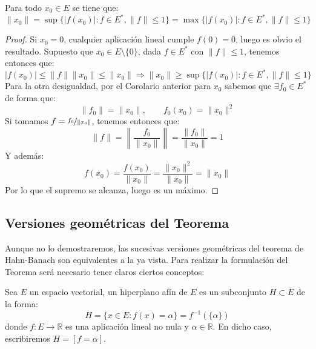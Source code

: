 \begin{coro}\label{coro:calcular_norma_x}
    Para todo $x_0\in E$ se tiene que:
    \begin{equation*}
        \|x_0\| = \sup\{|f(x_0)| : f\in E^\ast, \|f\| \leq 1\} = \max\{|f(x_0)| : f\in E^\ast, \|f\| \leq 1\}
    \end{equation*}
    \begin{proof}
        Si $x_0=0$, cualquier aplicación lineal cumple $f(0)=0$, luego es obvio el resultado. Supuesto que $x_0\in E\setminus\{0\}$, dada $f\in E^\ast$ con $\|f\| \leq 1$, tenemos entonces que:
        \begin{equation*}
            |f(x_0)| \leq \|f\|\|x_0\| \leq \|x_0\| \Longrightarrow \|x_0\| \geq \sup\{|f(x_0)| : f\in E^\ast, \|f\| \leq 1\} 
        \end{equation*}
        Para la otra desigualdad, por el Corolario anterior para $x_0$ sabemos que $\exists f_0\in E^\ast$ de forma que:
        \begin{equation*}
            \|f_0\| = \|x_0\|, \qquad f_0(x_0) = \|x_0\|^2
        \end{equation*}
        Si tomamos $f = \nicefrac{f_0}{\|x_0\|}$, tenemos entonces que:
        \begin{equation*}
            \|f\| = \left\|\dfrac{f_0}{\|x_0\|}\right\| = \dfrac{\|f_0\|}{\|x_0\|} = 1
        \end{equation*}
        Y además:
        \begin{equation*}
            f(x_0) = \dfrac{f(x_0)}{\|x_0\|} = \dfrac{\|x_0\|^2}{\|x_0\|} = \|x_0\|
        \end{equation*}
        Por lo que el supremo se alcanza, luego es un máximo.
    \end{proof}
\end{coro}

\subsection{Versiones geométricas del Teorema}
\noindent
Aunque no lo demostraremos, las sucesivas versiones geométricas del teorema de Hahn-Banach son equivalentes a la ya vista. Para realizar la formulación del Teorema será necesario tener claros ciertos conceptos:

\begin{definicion}
    Sea $E$ un espacio vectorial, un hiperplano afín de $E$ es un subconjunto $H\subset E$ de la forma:
    \begin{equation*}
        H = \{x\in E : f(x) = \alpha\} = f^{-1}(\{\alpha\})
    \end{equation*}
    donde $f:E\to \mathbb{R}$ es una aplicación lineal no nula y $\alpha\in \mathbb{R}$. En dicho caso, escribiremos $H = [f=\alpha]$.
\end{definicion}

